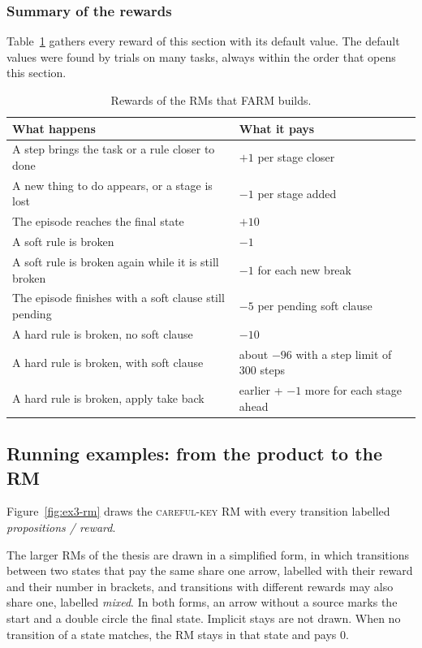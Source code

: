 \documentclass[11pt,english,listoffigures,listoftables]{tfgetsinf}
\newcommand{\runex}[1]{\textsc{#1}}  %
\newcommand{\gain}[1]{\textcolor{green!40!black}{\bfseries\boldmath #1}}  %
\newcommand{\loss}[1]{\textcolor{red!60!black}{\bfseries\boldmath #1}}  %
\begin{document}
\subsubsection{Summary of the rewards}
Table~\ref{tab:rewards} gathers every reward of this section with its default value. The default values were found by trials on many tasks, always within the order that opens this section.

\begin{table}[H]
\centering
\footnotesize
\renewcommand{\arraystretch}{1.2}
\begin{tabularx}{\textwidth}{@{}>{\raggedright\arraybackslash}X>{\raggedright\arraybackslash}p{6.2cm}@{}}
\toprule
\textbf{What happens} & \textbf{What it pays} \\ \midrule
A step brings the task or a rule closer to done & \gain{$+1$} per stage closer \\
A new thing to do appears, or a stage is lost & \loss{$-1$} per stage added \\
The episode reaches the final state &\gain{$+10$} \\
A soft rule is broken & \loss{$-1$} \\
A soft rule is broken again while it is still broken & \loss{$-1$} for each new break \\
The episode finishes with a soft clause still pending &\loss{$-5$} per pending soft clause \\
A hard rule is broken, no soft clause & \loss{$-10$} \\
A hard rule is broken, with soft clause & about \loss{$-96$} with a step limit of 300 steps \\
A hard rule is broken, apply take back & earlier + \loss{$-1$} more for each stage ahead \\ \bottomrule
\end{tabularx}
\caption{Rewards of the RMs that FARM builds.}
\label{tab:rewards}
\end{table}

\subsection{Running examples: from the product to the RM}
\label{sec:run-step4}
Figure~\ref{fig:ex3-rm} draws the \runex{careful-key} RM with every transition labelled \textit{propositions / reward}.

The larger RMs of the thesis are drawn in a simplified form, in which transitions between two states that pay the same share one arrow, labelled with their reward and their number in brackets, and transitions with different rewards may also share one, labelled \textit{mixed}. In both forms, an arrow without a source marks the start and a double circle the final state. Implicit stays are not drawn. When no transition of a state matches, the RM stays in that state and pays 0.
\end{document}
